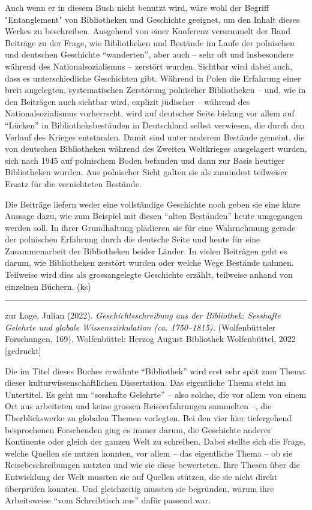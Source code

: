 \documentclass[a4paper,
fontsize=11pt,
oneside,
numbers=noperiodatend,
parskip=half-,
bibliography=totoc,
final
]{scrartcl}
\begin{document}
Auch wenn er in diesem Buch nicht benutzt wird, wäre wohl der Begriff
"Entanglement" von Bibliotheken und Geschichte geeignet, um den Inhalt
dieses Werkes zu beschreiben. Ausgehend von einer Konferenz versammelt
der Band Beiträge zu der Frage, wie Bibliotheken und Bestände im Laufe
der polnischen und deutschen Geschichte \enquote{wanderten}, aber auch
-- sehr oft und insbesondere während des Nationalsozialismus -- zerstört
wurden. Sichtbar wird dabei auch, dass es unterschiedliche Geschichten
gibt. Während in Polen die Erfahrung einer breit angelegten,
systematischen Zerstörung polnischer Bibliotheken -- und, wie in den
Beiträgen auch sichtbar wird, explizit jüdischer -- während des
Nationalsozialismus vorherrscht, wird auf deutscher Seite bislang vor
allem auf \enquote{Lücken} in Bibliotheksbeständen in Deutschland selbst
verwiesen, die durch den Verlauf des Krieges entstanden. Damit sind
unter anderem Bestände gemeint, die von deutschen Bibliotheken während
des Zweiten Weltkrieges ausgelagert wurden, sich nach 1945 auf
polnischem Boden befanden und dann zur Basis heutiger Bibliotheken
wurden. Aus polnischer Sicht galten sie als zumindest teilweiser Ersatz
für die vernichteten Bestände.

Die Beiträge liefern weder eine vollständige Geschichte noch geben sie
eine klare Aussage dazu, wie zum Beispiel mit diesen \enquote{alten
Beständen} heute umgegangen werden soll. In ihrer Grundhaltung plädieren
sie für eine Wahrnehmung gerade der polnischen Erfahrung durch die
deutsche Seite und heute für eine Zusammenarbeit der Bibliotheken beider
Länder. In vielen Beiträgen geht es darum, wie Bibliotheken zerstört
wurden oder welche Wege Bestände nahmen. Teilweise wird dies als
grossangelegte Geschichte erzählt, teilweise anhand von einzelnen
Büchern. (ks)

\begin{center}\rule{0.5\linewidth}{0.5pt}\end{center}

zur Lage, Julian (2022). \emph{Geschichtsschreibung aus der Bibliothek:
Sesshafte Gelehrte und globale Wissenszirkulation (ca. 1750--1815).}
(Wolfenbütteler Forschungen, 169). Wolfenbüttel: Herzog August
Bibliothek Wolfenbüttel, 2022 {[}gedruckt{]}

Die im Titel dieses Buches erwähnte \enquote{Bibliothek} wird erst sehr
spät zum Thema dieser kulturwissenschaftlichen Dissertation. Das
eigentliche Thema steht im Untertitel. Es geht um \enquote{sesshafte
Gelehrte} -- also solche, die vor allem von einem Ort aus arbeiteten und
keine grossen Reiseerfahrungen sammelten --, die Überblickswerke zu
globalen Themen vorlegten. Bei den vier hier tiefergehend besprochenen
Forschenden ging es immer darum, die Geschichte anderer Kontinente oder
gleich der ganzen Welt zu schreiben. Dabei stellte sich die Frage,
welche Quellen sie nutzen konnten, vor allem -- das eigentliche Thema --
ob sie Reisebeschreibungen nutzten und wie sie diese bewerteten. Ihre
Thesen über die Entwicklung der Welt mussten sie auf Quellen stützen,
die sie nicht direkt überprüfen konnten. Und gleichzeitig mussten sie
begründen, warum ihre Arbeitsweise \enquote{vom Schreibtisch aus} dafür
passend war.
\end{document}

